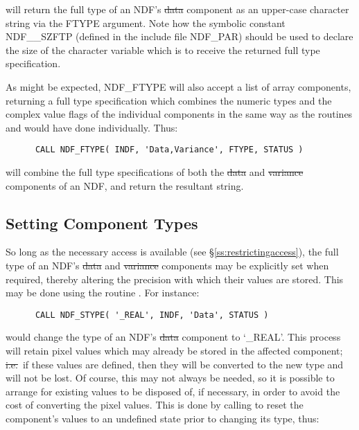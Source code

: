 will return the full type of an NDF's \st{data\/} component as an upper-case
character string via the FTYPE argument.
Note how the symbolic constant NDF\_\_SZFTP (defined in the include file
NDF\_PAR) should be used to declare the size of the character variable which
is to receive the returned full type specification.

As might be expected, NDF\_FTYPE will also accept a list of array
components, returning a full type specification which combines the numeric
types and the complex value flags of the individual components in the same
way as the routines  and  would have done individually. 
Thus:

\small
\begin{verbatim}
      CALL NDF_FTYPE( INDF, 'Data,Variance', FTYPE, STATUS )
\end{verbatim}
\normalsize

will combine the full type specifications of both the \st{data\/} and
\st{variance\/} components of an NDF, and return the resultant string.


\subsection{\label{ss:stype}Setting Component Types}

So long as the necessary access is available (see
\S\ref{ss:restrictingaccess}), the full type of an NDF's \st{data\/}
and \st{variance\/} components may be explicitly set when required,
thereby altering 
the precision with which their values are stored. 
This may be done using the routine .
For instance:

\small
\begin{verbatim}
      CALL NDF_STYPE( '_REAL', INDF, 'Data', STATUS )
\end{verbatim}
\normalsize

would change the type of an NDF's \st{data\/} component to `\_REAL'.
This process will retain pixel values which may already be stored in the
affected component; \st{i.e.}\ if these values are defined, then they will be
converted to the new type and will not be lost. 
Of course, this may not always be needed, so it is possible to arrange for
existing values to be disposed of, if necessary, in order to avoid the cost of
converting the pixel values.
This is done by calling  to reset the component's  values to an
undefined state prior to changing its type, thus:

